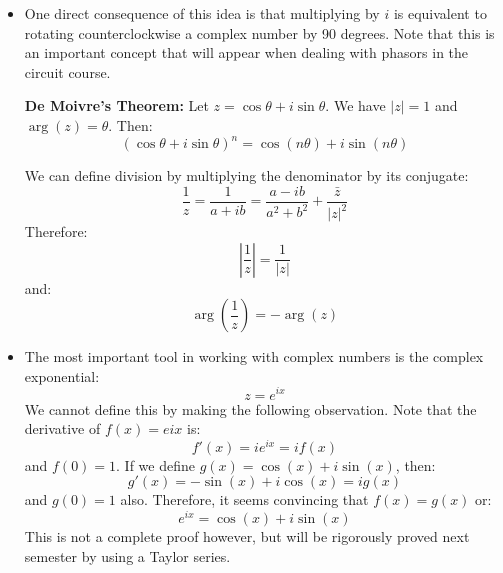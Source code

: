 \begin{itemize}
\begin{idea}
    \end{idea}
    \item One direct consequence of this idea is that multiplying by $i$ is equivalent to rotating counterclockwise a complex number by 90 degrees. Note that this is an important concept that will appear when dealing with phasors in the circuit course.
    \begin{theorem}
        \textbf{De Moivre's Theorem:} Let $z=\cos\theta+i\sin\theta$. We have $|z|=1$ and $\arg(z)=\theta$. Then:
        \begin{equation}
            (\cos\theta+i\sin\theta)^n = \cos(n\theta)+i\sin(n\theta)
        \end{equation}
    \end{theorem}
    \begin{definition}
        We can define division by multiplying the denominator by its conjugate:
        \begin{equation}
            \frac{1}{z} = \frac{1}{a+ib} = \frac{a-ib}{a^2+b^2} + \frac{\bar{z}}{|z|^2}
            \label{eq:}
        \end{equation}
        Therefore:
        \begin{equation}
            \left|\frac{1}{z}\right| = \frac{1}{|z|}
            \label{eq:}
        \end{equation}
        and:
        \begin{equation}
            \arg\left(\frac{1}{z}\right) = - \arg(z)
            \label{eq:}
        \end{equation}
    \end{definition}
    \item The most important tool in working with complex numbers is the complex exponential:
    \begin{equation}
        z = e^{ix}
        \label{eq:}
    \end{equation}
    We cannot define this by making the following observation. Note that the derivative of $f(x)=e{ix}$ is:
    \begin{equation}
        f'(x) = ie^{ix} = if(x)
        \label{eq:}
    \end{equation}
    and $f(0)=1$. If we define $g(x)=\cos(x)+i\sin(x)$, then:
    \begin{equation}
        g'(x) = -\sin(x)+i\cos(x) = ig(x)
        \label{eq:}
    \end{equation}
    and $g(0)=1$ also. Therefore, it seems convincing that $f(x)=g(x)$ or:
    \begin{equation}
        e^{ix} = \cos(x)+i\sin(x)
        \label{eq:}
    \end{equation}
    This is not a complete proof however, but will be rigorously proved next semester by using a Taylor series.
\end{itemize}